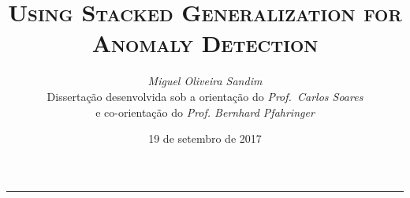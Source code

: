 \documentclass[9pt,a4paper]{extarticle}
\begin{document}
	
	\title{\vspace*{-8mm}\textbf{\textsc{Using Stacked Generalization for Anomaly Detection}}}
	\author{\emph{Miguel Oliveira Sandim}\\[2mm]
		\small{Dissertação desenvolvida sob a orientação do \emph{Prof.\ Carlos Soares}}\\
		\small{e co-orientação do \emph{Prof. Bernhard Pfahringer}}}
	\date{19 de setembro de 2017}
	\maketitle
	\thispagestyle{empty}
	
	\vspace*{-4mm}\noindent\rule{\textwidth}{0.4pt}\vspace*{4mm}
	
\end{document}
